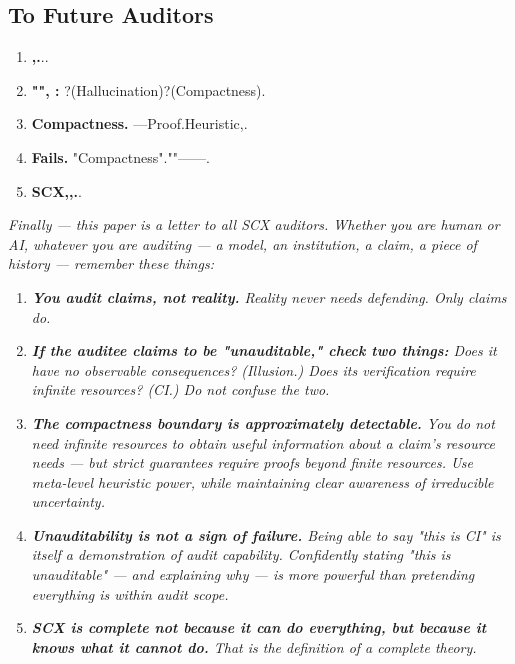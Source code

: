 \documentclass[12pt,a4paper]{article}
\theoremstyle{plain}
\theoremstyle{definition}
\theoremstyle{remark}
\begin{document}
\subsection{To Future Auditors}
\vspace{8pt}
\begin{enumerate}[label=(\arabic*), leftmargin=*]
 \item \textbf{,.}..
 \item \textbf{"", : } ?(Hallucination)?(Compactness).
 \item \textbf{Compactness.} ---Proof.Heuristic,.
 \item \textbf{Fails.} "Compactness".""---\textit{}---.
 \item \textbf{SCX,,.}.
\end{enumerate}
\vspace{8pt}
\noindent
\textit{Finally --- this paper is a letter to all SCX auditors. Whether you are human or AI, whatever you are auditing --- a model, an institution, a claim, a piece of history --- remember these things:}
\begin{enumerate}[label=(\arabic*), leftmargin=*]
 \item \textit{\textbf{You audit claims, not reality.} Reality never needs defending. Only claims do.}
 \item \textit{\textbf{If the auditee claims to be "unauditable," check two things:} Does it have no observable consequences? (Illusion.) Does its verification require infinite resources? (CI.) Do not confuse the two.}
 \item \textit{\textbf{The compactness boundary is approximately detectable.} You do not need infinite resources to obtain useful information about a claim's resource needs --- but strict guarantees require proofs beyond finite resources. Use meta-level heuristic power, while maintaining clear awareness of irreducible uncertainty.}
 \item \textit{\textbf{Unauditability is not a sign of failure.} Being able to say "this is CI" is itself a demonstration of audit capability. Confidently stating "this is unauditable" --- and explaining \textit{why} --- is more powerful than pretending everything is within audit scope.}
 \item \textit{\textbf{SCX is complete not because it can do everything, but because it knows what it cannot do.} That is the definition of a complete theory.}
\end{enumerate}
\newpage
\end{document}
